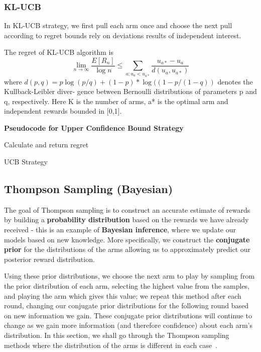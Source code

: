     \subsubsection{KL-UCB}
    In KL-UCB strategy, we first pull each arm once and choose the next pull according to regret bounds rely on deviations results of independent interest. \citep{Garivier2011}
    \par
    The regret of KL-UCB algorithm is $$\lim_{n\to \infty} \frac{E[R_n]}{\log n} \leq  \sum_{a:u_a < u_{a*}} \frac{u_{a*}-u_a}{d(u_a,u_{a*})}  $$ 
    where $d(p, q) = p \log(p/q) + (1 - p) * \log((1 - p/(1 - q))$ denotes the Kullback-Leibler diver- gence between Bernoulli distributions of parameters p and q, respectively. Here K is the number of arms, a* is the optimal arm and independent rewards bounded in [0,1].\citep{Garivier2011}
    \par
    \textbf{Pseudocode for Upper Confidence Bound Strategy}
    \newline
    \begin{algorithm}[H]
        Calculate and return regret
        \caption{UCB Strategy}\label{alg:ucb_algorithm}
    \end{algorithm}

    \subsection{Thompson Sampling (Bayesian)}\label{subsec:thompson-sampling-(bayesian)}
    The goal of Thompson sampling is to construct an accurate estimate of rewards by building a \textbf{probability distribution} based on the rewards we have already received - this is an example of \textbf{Bayesian inference}, where we update our models based on new knowledge.
    More specifically, we construct the \textbf{conjugate prior} for the distributions of the arms allowing us to approximately predict our posterior reward distribution.
    \par
    Using these prior distributions, we choose the next arm to play by sampling from the prior distribution of each arm, selecting the highest value from the samples, and playing the arm which gives this value;
    we repeat this method after each round, changing our conjugate prior distributions for the following round based on new information we gain.
    These conjugate prior distributions will continue to change as we gain more information (and therefore confidence) about each arm's distribution.
    In this section, we shall go through the Thompson sampling methods where the distribution of the arms is different in each case~\citep{agrawal2012analysis}.

